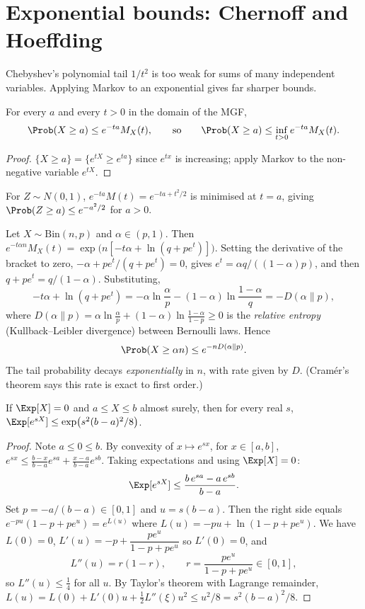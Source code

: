 \section{Exponential bounds: Chernoff and Hoeffding}

Chebyshev's polynomial tail $1/t^2$ is too weak for sums of many independent
variables. Applying Markov to an exponential gives far sharper bounds.

\begin{theorem}\label{thm:chernoff}
For every $a$ and every $t>0$ in the domain of the MGF,
\[
\Prob(X\ge a)\le e^{-ta}M_X(t),\qquad\text{so}\qquad
\Prob(X\ge a)\le\inf_{t>0}e^{-ta}M_X(t).
\]
\end{theorem}
\begin{proof}
$\{X\ge a\}=\{e^{tX}\ge e^{ta}\}$ since $e^{tx}$ is increasing; apply Markov to the
non-negative variable $e^{tX}$.
\end{proof}

\begin{example}
For $Z\sim N(0,1)$, $e^{-ta}M(t)=e^{-ta+t^2/2}$ is minimised at $t=a$, giving
$\Prob(Z\ge a)\le e^{-a^2/2}$ for $a>0$.
\end{example}

\begin{example}\label{ex:chernoffbin}
Let $X\sim\mathrm{Bin}(n,p)$ and $\alpha\in(p,1)$. Then $e^{-t\alpha n}M_X(t)=
\exp\bigl(n[-t\alpha+\ln(q+pe^t)]\bigr)$. Setting the derivative of the bracket to
zero, $-\alpha+pe^t/(q+pe^t)=0$, gives $e^t=\alpha q/((1-\alpha)p)$, and then
$q+pe^t=q/(1-\alpha)$. Substituting,
\[
-t\alpha+\ln(q+pe^t)=-\alpha\ln\frac\alpha p-(1-\alpha)\ln\frac{1-\alpha}q=-D(\alpha\|p),
\]
where $D(\alpha\|p)=\alpha\ln\frac\alpha p+(1-\alpha)\ln\frac{1-\alpha}{1-p}\ge0$ is the
\emph{relative entropy} (Kullback--Leibler divergence) between Bernoulli laws. Hence
\[
\Prob(X\ge\alpha n)\le e^{-nD(\alpha\|p)}.
\]
The tail probability decays \emph{exponentially} in $n$, with rate given by $D$.
(Cram\'er's theorem says this rate is exact to first order.)
\end{example}

\begin{lemma}\label{lem:hoeffding}
If $\Exp[X]=0$ and $a\le X\le b$ almost surely, then for every real $s$,
$\Exp[e^{sX}]\le\exp\bigl(s^2(b-a)^2/8\bigr)$.
\end{lemma}
\begin{proof}
Note $a\le0\le b$. By convexity of $x\mapsto e^{sx}$, for $x\in[a,b]$,
$e^{sx}\le\frac{b-x}{b-a}e^{sa}+\frac{x-a}{b-a}e^{sb}$. Taking expectations
and using $\Exp[X]=0$:
\[
\Exp[e^{sX}]\le\frac{b\,e^{sa}-a\,e^{sb}}{b-a}.
\]
Set $p=-a/(b-a)\in[0,1]$ and $u=s(b-a)$. Then the right side equals
$e^{-pu}(1-p+pe^u)=e^{L(u)}$ where $L(u)=-pu+\ln(1-p+pe^u)$. We have $L(0)=0$,
$L'(u)=-p+\dfrac{pe^u}{1-p+pe^u}$ so $L'(0)=0$, and
\[
L''(u)=r(1-r),\qquad r=\frac{pe^u}{1-p+pe^u}\in[0,1],
\]
so $L''(u)\le\tfrac14$ for all $u$. By Taylor's theorem with Lagrange remainder,
$L(u)=L(0)+L'(0)u+\tfrac12L''(\xi)u^2\le u^2/8=s^2(b-a)^2/8$.
\end{proof}

